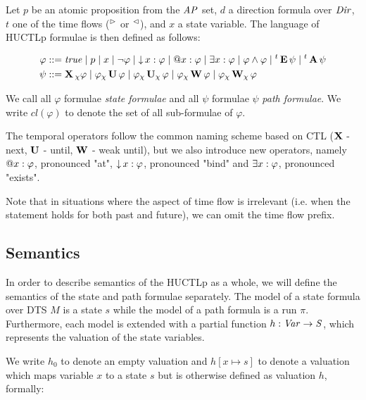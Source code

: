 \begin{definition}
	Let $p$ be an atomic proposition from the $\mathit{AP}$ set, $d$ a direction formula over $\mathit{Dir}$,  $t$ one of the time flows (${}^\vartriangleright{}$ or ${}^\vartriangleleft{}$), and $x$ a state variable. The language of \ac{HUCTLp} formulae is then defined as follows:
	
	\begin{align*}
	\varphi 	&::= 	\mathit{true} 
	\mid p 
	\mid x 
	\mid  \neg \varphi 
	\mid \operatorname{\downarrow} x : \varphi 
	\mid \operatorname{@\!} x : \varphi 
	\mid \exists x : \varphi 
	\mid \varphi \land \varphi 
	\mid {}^{t}\operatorname{\mathbf{E}} \psi 
	\mid {}^{t}\operatorname{\mathbf{A}} \psi 
	\\
	\psi 		  &::= 	  
	\operatorname{\mathbf{X}}{}_{\chi} \varphi \mid
	\varphi {}_{\chi}\operatorname{\mathbf{U}} \varphi \mid
	\varphi {}_{\chi}\operatorname{\mathbf{U}}_{\chi} \varphi \mid
	\varphi {}_{\chi}\operatorname{\mathbf{W}} \varphi \mid
	\varphi {}_{\chi}\operatorname{\mathbf{W}}_{\chi} \varphi
	\\
	\end{align*}
	
\end{definition}

We call all $\varphi$ formulae \emph{state formulae} and all $\psi$ formulae $\psi$ \emph{path formulae}. We write $cl(\varphi)$ to denote the set of all sub-formulae of $\varphi$.

The temporal operators follow the common naming scheme based on \ac{CTL} ($\operatorname{\mathbf{X}}$ - next, $\operatorname{\mathbf{U}}$ - until, $\operatorname{\mathbf{W}}$ - weak until), but we also introduce new operators, namely $\operatorname{@\!} x : \varphi$, pronounced "at", $\operatorname{\downarrow} x : \varphi$, pronounced "bind" and $\exists x : \varphi$, pronounced "exists".

Note that in situations where the aspect of time flow is irrelevant (i.e. when the statement holds for both past and future), we can omit the time flow prefix.

\subsection{Semantics}

In order to describe semantics of the \ac{HUCTLp} as a whole, we will define the semantics of the state and path formulae separately. The model of a state formula over \ac{DTS} $M$ is a state $s$ while the model of a path formula is a run $\pi$. Furthermore, each model is extended with a partial function $h : \mathit{Var} \to \mathit{S}$, which represents the valuation of the state variables.

We write $h_0$ to denote an empty valuation and $h[x \mapsto s]$ to denote a valuation which maps variable $x$ to a state $s$ but is otherwise defined as valuation $h$, formally:

